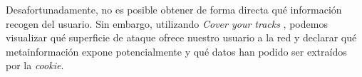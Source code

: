 Desafortunadamente, no es posible obtener de forma directa qué información recogen del usuario. Sin embargo, utilizando \textit{Cover your tracks} \cite{coveryourtracks}, podemos visualizar qué superficie de ataque ofrece nuestro usuario a la red y declarar qué metainformación expone potencialmente y qué datos han podido ser extraídos por la \textit{cookie}.

